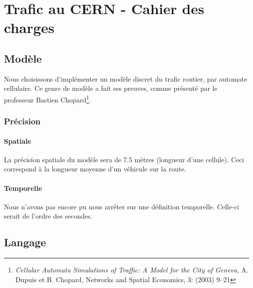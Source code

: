 \documentclass[a4paper,10pt]{extarticle}
\begin{document}
\pagestyle{fancy}
\renewcommand{\headheight}{24pt}
\rhead{\today}

\section*{Trafic au CERN - Cahier des charges}

\subsection*{Modèle}

Nous choisissons d'implémenter un modèle discret du trafic routier, par automate cellulaire. Ce genre de modèle a fait ses preuves, comme présenté par le professeur Bastien Chopard\footnote{\emph{Cellular Automata Simulations of Traffic:
A Model for the City of Geneva}, A. Dupuis et B. Chopard, Networks and Spatial Economics, 3: (2003) 9–21}.



\subsubsection*{Précision}

\paragraph{Spatiale}

La précision spatiale du modèle sera de 7.5 mètres (longueur d'une cellule). Ceci correspond à la longueur moyenne d'un véhicule sur la route.

\paragraph{Temporelle}

Nous n'avons pas encore pu nous arrêter sur une définition temporelle. Celle-ci serait de l'ordre des secondes.

\subsection*{Langage}
\end{document}
